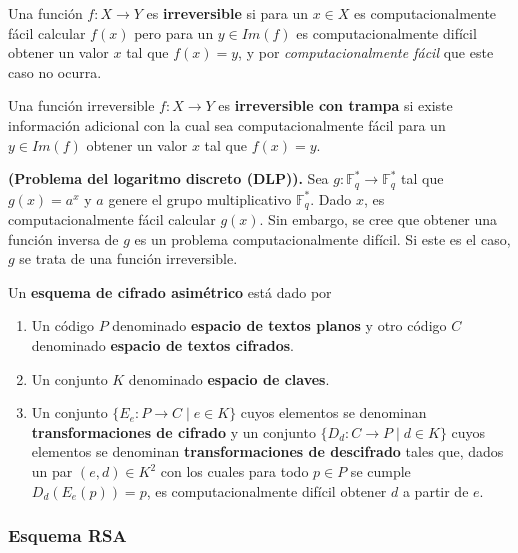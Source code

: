 \begin{definition}
	Una función $f : X \rightarrow Y$ es \textbf{irreversible} si para un $x \in X$ es computacionalmente fácil calcular $f(x)$ pero para un $y \in Im(f)$ es computacionalmente difícil obtener un valor $x$ tal que $f(x) = y$, y por \textit{computacionalmente fácil} que este caso no ocurra.
\end{definition}

\begin{definition}
	Una función irreversible $f : X \rightarrow Y$ es \textbf{irreversible con trampa} si existe información adicional con la cual sea computacionalmente fácil para un $y \in Im(f)$ obtener un valor $x$ tal que $f(x) = y$.
\end{definition}

\begin{example} \textbf{(Problema del logaritmo discreto (DLP)).}
Sea $g : \mathbb{F}_q^* \rightarrow \mathbb{F}_q^*$ tal que $g(x) = a^x$ y $a$ genere el grupo multiplicativo $\mathbb{F}_q^*$. Dado $x$, es computacionalmente fácil calcular $g(x)$. Sin embargo, se cree que obtener una función inversa de $g$ es un problema computacionalmente difícil. Si este es el caso, $g$ se trata de una función irreversible.
\end{example}

\begin{definition}
	Un \textbf{esquema de cifrado asimétrico} está dado por
	\begin{enumerate}
		\item Un código $P$ denominado \textbf{espacio de textos planos} y otro código $C$ denominado \textbf{espacio de textos cifrados}.
		\item Un conjunto $K$ denominado \textbf{espacio de claves}.
		\item Un conjunto $\{E_e : P \rightarrow C \mid e \in K\}$ cuyos elementos se denominan \textbf{transformaciones de cifrado} y un conjunto $\{D_d : C \rightarrow P \mid d \in K\}$ cuyos elementos se denominan \textbf{transformaciones de descifrado} tales que, dados un par $(e, d) \in K^2$ con los cuales para todo $p \in P$ se cumple $D_d(E_e(p)) = p$, es computacionalmente difícil obtener $d$ a partir de $e$.
	\end{enumerate}
\end{definition}

\subsubsection{Esquema RSA}

